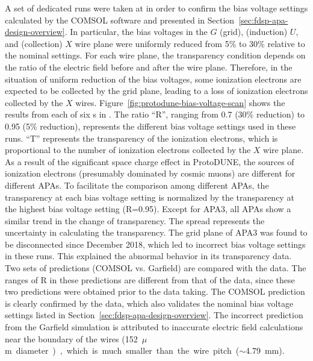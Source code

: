 A set of dedicated runs were taken at  in order to confirm the bias voltage settings calculated by the COMSOL software %
and presented in Section~\ref{sec:fdsp-apa-design-overview}. In particular, the bias voltages in the $G$ (grid), (induction) $U$, and (collection) $X$ wire plane were uniformly reduced from 5\% to 30\% relative to the nominal settings. For each wire plane, the transparency condition depends on the ratio of the electric field before and after the wire plane. Therefore, in the situation of uniform reduction of the bias voltages, some ionization electrons are expected to be collected by the grid plane, leading to a loss of ionization electrons collected by the $X$ wires. Figure~\ref{fig:protodune-bias-voltage-scan} shows the results from each of six s in . The ratio ``R'', ranging from 0.7 (30\% reduction) to 0.95 (5\% reduction), represents the different bias voltage settings used in these runs. ``T'' represents the transparency of the ionization electrons, which is proportional to the number of ionization electrons collected by the $X$ wire plane. As a result of the significant space charge effect in ProtoDUNE, the sources of ionization electrons (presumably dominated by cosmic muons) are different for different APAs. To facilitate the comparison among different APAs, the transparency at each bias voltage setting is normalized by the transparency at the highest bias voltage setting (R=0.95). Except for APA3, all APAs show a similar trend in the change of transparency. The spread represents the uncertainty in calculating the transparency. The grid plane of APA3 was found to be disconnected since December 2018, which led to incorrect bias voltage settings in these runs. This explained the abnormal behavior in its transparency data. Two sets of predictions (COMSOL vs. Garfield) are compared with the  data. The ranges of R in these predictions are different from that of the  data, since these two predictions were obtained prior to the  data taking. The COMSOL prediction is clearly confirmed by the  data, which also validates the nominal bias voltage settings listed in Section~\ref{sec:fdsp-apa-design-overview}. The incorrect prediction from the Garfield simulation is attributed to inaccurate electric field calculations near the boundary of the wires (\SI{152}{$\mu$m} diameter), which is much smaller than the wire pitch ($\sim$\SI{4.79}{mm}). 

